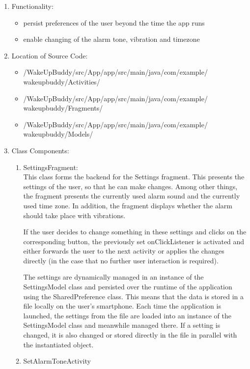\documentclass[conference]{IEEEtran}
\begin{document}
\begin{enumerate}
    \item Functionality: 
    \begin{itemize}
        \item persist preferences of the user beyond the time the app runs
        \item enable changing of the alarm tone, vibration and timezone
    \end{itemize} 
    \item Location of Source Code:
    \begin{itemize}
        \item /WakeUpBuddy/src/App/app/src/main/java/com/example/ wakeupbuddy/Activities/
        \item /WakeUpBuddy/src/App/app/src/main/java/com/example/ wakeupbuddy/Fragments/
        \item /WakeUpBuddy/src/App/app/src/main/java/com/example/ wakeupbuddy/Models/
    \end{itemize} 
    \item Class Components:
    \begin{enumerate}
        \item SettingsFragment: \\
            This class forms the backend for the Settings fragment. This presents the settings of the user, so that he can make changes. Among other things, the fragment presents the currently used alarm sound and the currently used time zone. In addition, the fragment displays whether the alarm should take place with vibrations.
            \par If the user decides to change something in these settings and clicks on the corresponding button, the previously set onClickListener is activated and either forwards the user to the next activity or applies the changes directly (in the case that no further user interaction is required).
            \par The settings are dynamically managed in an instance of the SettingsModel class and persisted over the runtime of the application using the SharedPreference class. This means that the data is stored in a file locally on the user's smartphone. Each time the application is launched, the settings from the file are loaded into an instance of the SettingsModel class and meanwhile managed there. If a setting is changed, it is also changed or stored directly in the file in parallel with the instantiated object. \\
        \item SetAlarmToneActivity \\

\end{enumerate}
\end{enumerate}
\end{document}
